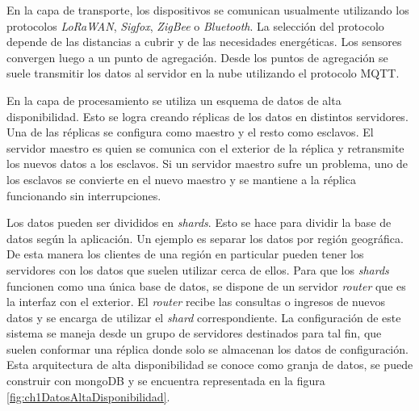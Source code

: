 En la capa de transporte, los dispositivos se comunican usualmente utilizando los protocolos \emph{LoRaWAN}, \emph{Sigfox}, \emph{ZigBee} o \emph{Bluetooth}.
La selección del protocolo depende de las distancias a cubrir y de las necesidades energéticas.
Los sensores convergen luego a un punto de agregación.
Desde los puntos de agregación se suele transmitir los datos al servidor en la nube utilizando el protocolo MQTT.

En la capa de procesamiento se utiliza un esquema de datos de alta disponibilidad.
Esto se logra creando réplicas de los datos en distintos servidores.
Una de las réplicas se configura como maestro y el resto como esclavos.
El servidor maestro es quien se comunica con el exterior de la réplica y retransmite los nuevos datos a los esclavos.
Si un servidor maestro sufre un problema, uno de los esclavos se convierte en el nuevo maestro y se mantiene a la réplica funcionando sin interrupciones.

Los datos pueden ser divididos en \emph{shards}.
Esto se hace para dividir la base de datos según la aplicación.
Un ejemplo es separar los datos por región geográfica.
De esta manera los clientes de una región en particular pueden tener los servidores con los datos que suelen utilizar cerca de ellos.
Para que los \emph{shards} funcionen como una única base de datos, se dispone de un servidor \emph{router} que es la interfaz con el exterior.
El \emph{router} recibe las consultas o ingresos de nuevos datos y se encarga de utilizar el \emph{shard} correspondiente.
La configuración de este sistema se maneja desde un grupo de servidores destinados para tal fin, que suelen conformar una réplica donde solo se almacenan los datos de configuración.
Esta arquitectura de alta disponibilidad se conoce como granja de datos, se puede construir con mongoDB \citep{WEBSITE:mongodbSharding} y se encuentra representada en la figura \ref{fig:ch1DatosAltaDisponibilidad}.

